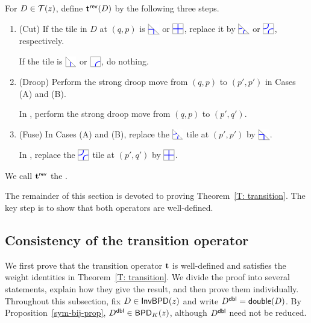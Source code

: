 \documentclass[10pt]{article}
\begin{document}
\begin{definition}
\label{D: Reverse Transition operator}
For $D\in\mathcal{T}(z)$,
define $\mathbf t^{\mathsf{rev}}(D)$ by the following three steps.
\begin{enumerate}
\item[1.] (Cut)
If the tile in $D$ at $(q,p)$ is $\PDIAG$
or $\PTILE$, replace it by $\EDIAG$
or $\ETILE$, respectively.

If the tile is $\CDIAG$ or $\CTILE$,
do nothing.

\item[2.] (Droop)
Perform the strong droop move
from $(q,p)$ to $(p',p')$ in Cases (A) and (B).

In \CaseC, perform the strong droop
move from  $(q,p)$ to $(p',q')$.

\item[3.] (Fuse)
In Cases (A) and (B),
replace the $\EDIAG$ tile at $(p',p')$
by $\PDIAG$.

In \CaseC,
replace the $\ETILE$ tile at $(p',q')$
by $\PTILE$.
\end{enumerate}
We call $\mathbf t^{\mathsf{rev}}$ the .
\end{definition}



The remainder of this section is devoted to proving
Theorem~\ref{T: transition}.
The key step is to show that
both operators are well-defined. 

\subsection{Consistency of the transition operator}
\label{SS: trans well defined}


We first prove that the transition operator $\mathbf t$ is well-defined
and satisfies the weight identities in Theorem~\ref{T: transition}.
We divide the proof into several statements, explain how they give the
result, and then prove them individually.
Throughout this subsection, fix $D\in\mathsf{InvBPD}(z)$ and write
$D^{\mathsf{dbl}}=\mathsf{double}(D)$. By Proposition~\ref{sym-bij-prop},
$D^{\mathsf{dbl}}\in\mathsf{BPD}_K(z)$, although $D^{\mathsf{dbl}}$ need not be reduced.
\end{document}
